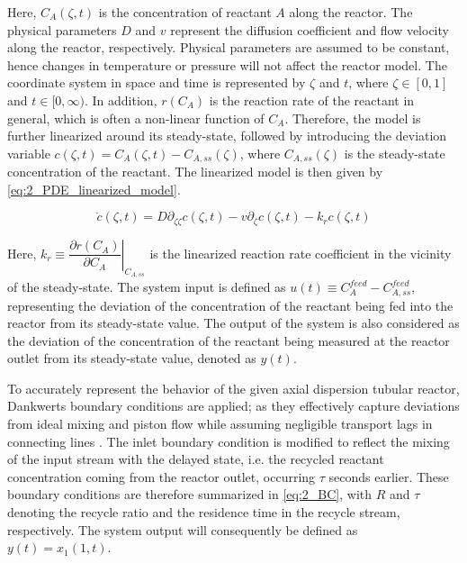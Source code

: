 Here, $C_A(\zeta, t)$ is the concentration of reactant $A$ along the reactor. The physical parameters $D$ and $v$ represent the diffusion coefficient and flow velocity along the reactor, respectively. Physical parameters are assumed to be constant, hence changes in temperature or pressure will not affect the reactor model. The coordinate system in space and time is represented by $\zeta$ and $t$, where $\zeta \in [0, 1]$ and $t \in [0, \infty)$. In addition, $r(C_A)$ is the reaction rate of the reactant in general, which is often a non-linear function of $C_A$. Therefore, the model is further linearized around its steady-state, followed by introducing the deviation variable $c(\zeta, t) = C_A(\zeta, t) - C_{A, ss}(\zeta)$, where $C_{A, ss}(\zeta)$ is the steady-state concentration of the reactant. The linearized model is then given by \eqref{eq:2_PDE_linearized_model}.

\begin{equation} \label{eq:2_PDE_linearized_model}
    \dot{c}(\zeta, t) = D \partial_{\zeta \zeta} c(\zeta, t) - v \partial_\zeta c(\zeta, t) - k_r c(\zeta, t)
\end{equation}

Here, $k_r \equiv \left. \dfrac{\partial r(C_A)}{\partial C_A} \right|_{C_{A, ss}}$ is the linearized reaction rate coefficient in the vicinity of the steady-state. The system input is defined as $u(t) \equiv C_{A}^{feed} - C_{A, ss}^{feed}$, representing the deviation of the concentration of the reactant being fed into the reactor from its steady-state value. The output of the system is also considered as the deviation of the concentration of the reactant being measured at the reactor outlet from its steady-state value, denoted as $y(t)$. 

To accurately represent the behavior of the given axial dispersion tubular reactor, Dankwerts boundary conditions are applied; as they effectively capture deviations from ideal mixing and piston flow while assuming negligible transport lags in connecting lines \cite{Danckwerts1953Continuous}.
The inlet boundary condition is modified to reflect the mixing of the input stream with the delayed state, i.e. the recycled reactant concentration coming from the reactor outlet, occurring $\tau$ seconds earlier.
These boundary conditions are therefore summarized in \eqref{eq:2_BC}, with $R$ and $\tau$ denoting the recycle ratio and the residence time in the recycle stream, respectively. The system output will consequently be defined as $y(t) = x_1(1, t)$. 

